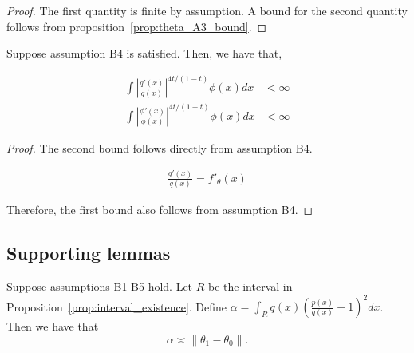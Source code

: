 \documentclass{article}
\begin{document}
\begin{proof}
The first quantity is finite by assumption. A bound for the second quantity follows from proposition~\ref{prop:theta_A3_bound}.
\end{proof}


\begin{proposition}
\label{prop:theta_A4_bound2}
Suppose assumption B4 is satisfied. Then, we have that,

\begin{align*}
\int \left| \frac{q'(x)}{q(x)} \right|^{4t/(1-t)} \phi(x) dx &< \infty \\
\int \left| \frac{\phi'(x)}{\phi(x)} \right|^{4t/(1-t)} \phi(x) dx &< \infty 
\end{align*}

\end{proposition}

\begin{proof}

The second bound follows directly from assumption B4.

\begin{align*}
\frac{q'(x)}{q(x)} = f'_{\theta}(x)
\end{align*}

Therefore, the first bound also follows from assumption B4. 

\end{proof}




\subsection{Supporting lemmas}

\begin{lemma}
\label{lem:chi_square_theta_equivalence}
Suppose assumptions B1-B5 hold. Let $R$ be the interval in Proposition~\ref{prop:interval_existence}. Define $\alpha = \int_R q(x) \left( \frac{p(x)}{q(x)} - 1 \right)^2 dx$. Then we have that
\[
\alpha \asymp \| \theta_1 - \theta_0 \|.
\]
\end{lemma}
\end{document}
